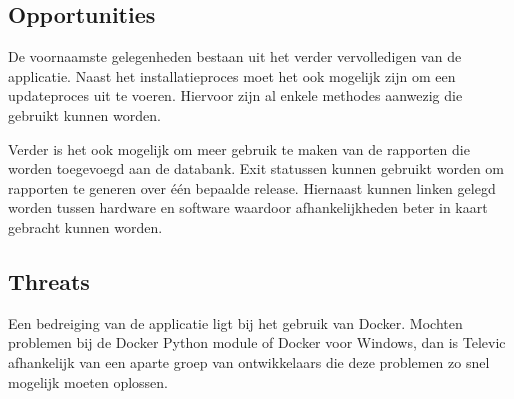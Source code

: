 \subsection{Opportunities}
De voornaamste gelegenheden bestaan uit het verder vervolledigen van de applicatie.
Naast het installatieproces moet het ook mogelijk zijn om een updateproces uit te voeren.
Hiervoor zijn al enkele methodes aanwezig die gebruikt kunnen worden.

Verder is het ook mogelijk om meer gebruik te maken van de rapporten die worden toegevoegd aan de databank.
Exit statussen kunnen gebruikt worden om rapporten te generen over één bepaalde release.
Hiernaast kunnen linken gelegd worden tussen hardware en software waardoor afhankelijkheden beter in kaart gebracht kunnen worden.

\subsection{Threats}
Een bedreiging van de applicatie ligt bij het gebruik van Docker.
Mochten problemen bij de Docker Python module of Docker voor Windows, dan is Televic afhankelijk van een aparte groep van ontwikkelaars die deze problemen zo snel mogelijk moeten oplossen.


